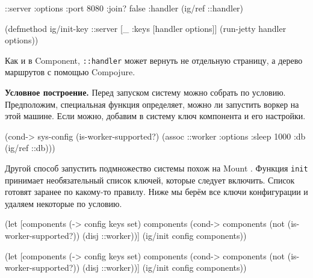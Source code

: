 \else

\begin{english}
  \begin{clojure}
{::server {:options {:port 8080 :join? false}
           :handler (ig/ref ::handler)}}

(defmethod ig/init-key ::server
  [_ {:keys [handler options]}]
  (run-jetty handler options))
  \end{clojure}
\end{english}

\fi

Как и в Component, \verb|::handler| может вернуть не отдельную
страницу, а дерево маршрутов с помощью Compojure.


\textbf{Условное построение.} Перед запуском систему можно собрать по
условию. Предположим, специальная функция определяет, можно ли запустить воркер
на этой машине. Если можно, добавим в систему ключ компонента и его настройки.

\begin{english}
  \begin{clojure}
(cond-> sys-config
  (is-worker-supported?)
  (assoc ::worker {:options {:sleep 1000}
                   :db (ig/ref ::db)}))
  \end{clojure}
\end{english}

Другой способ запустить подмножество системы похож на
Mount . Функция \verb|init| принимает необязательный
список ключей, которые следует включить. Список готовят заранее по какому-то
правилу. Ниже мы берём все ключи конфигурации и удаляем некоторые по условию.

\pagebreakafive

\ifnarrow

\begin{english}
  \begin{clojure}
(let [components (-> config keys set)
      components
      (cond-> components
        (not (is-worker-supported?))
        (disj ::worker))]
  (ig/init config components))
  \end{clojure}
\end{english}

\else

\begin{english}
  \begin{clojure}
(let [components (-> config keys set)
      components (cond-> components
                   (not (is-worker-supported?))
                   (disj ::worker))]
  (ig/init config components))
  \end{clojure}
\end{english}

